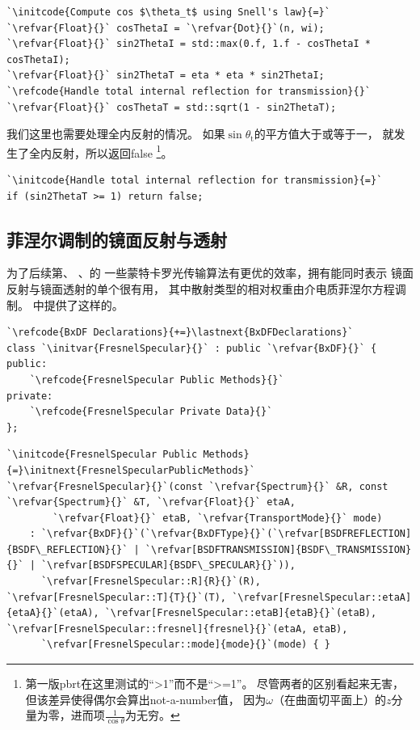 \begin{lstlisting}
`\initcode{Compute cos $\theta_t$ using Snell's law}{=}`
`\refvar{Float}{}` cosThetaI = `\refvar{Dot}{}`(n, wi);
`\refvar{Float}{}` sin2ThetaI = std::max(0.f, 1.f - cosThetaI * cosThetaI);
`\refvar{Float}{}` sin2ThetaT = eta * eta * sin2ThetaI;
`\refcode{Handle total internal reflection for transmission}{}`
`\refvar{Float}{}` cosThetaT = std::sqrt(1 - sin2ThetaT);
\end{lstlisting}

我们这里也需要处理全内反射的情况。
如果$\sin\theta_{\mathrm{t}}$的平方值大于或等于一，
就发生了全内反射，所以返回{\ttfamily false}
\footnote{第一版pbrt在这里测试的“>1”而不是“>=1”。
    尽管两者的区别看起来无害，但该差异使得偶尔会算出not-a-number值，
    因为$\omega$（在曲面切平面上）的$z$分量为零，进而项$\frac{1}{\cos\theta}$为无穷。}。
\begin{lstlisting}
`\initcode{Handle total internal reflection for transmission}{=}`
if (sin2ThetaT >= 1) return false;
\end{lstlisting}

\subsection{菲涅尔调制的镜面反射与透射}\label{sub:菲涅尔调制的镜面反射与透射}
为了后续第、
、的
一些蒙特卡罗光传输算法有更优的效率，拥有能同时表示
镜面反射与镜面透射的单个很有用，
其中散射类型的相对权重由介电质菲涅尔方程调制。
中提供了这样的。
\begin{lstlisting}
`\refcode{BxDF Declarations}{+=}\lastnext{BxDFDeclarations}`
class `\initvar{FresnelSpecular}{}` : public `\refvar{BxDF}{}` {
public:
    `\refcode{FresnelSpecular Public Methods}{}`
private:
    `\refcode{FresnelSpecular Private Data}{}`
};
\end{lstlisting}
\begin{lstlisting}
`\initcode{FresnelSpecular Public Methods}{=}\initnext{FresnelSpecularPublicMethods}`
`\refvar{FresnelSpecular}{}`(const `\refvar{Spectrum}{}` &R, const `\refvar{Spectrum}{}` &T, `\refvar{Float}{}` etaA,
        `\refvar{Float}{}` etaB, `\refvar{TransportMode}{}` mode) 
    : `\refvar{BxDF}{}`(`\refvar{BxDFType}{}`(`\refvar[BSDFREFLECTION]{BSDF\_REFLECTION}{}` | `\refvar[BSDFTRANSMISSION]{BSDF\_TRANSMISSION}{}` | `\refvar[BSDFSPECULAR]{BSDF\_SPECULAR}{}`)),
      `\refvar[FresnelSpecular::R]{R}{}`(R), `\refvar[FresnelSpecular::T]{T}{}`(T), `\refvar[FresnelSpecular::etaA]{etaA}{}`(etaA), `\refvar[FresnelSpecular::etaB]{etaB}{}`(etaB), `\refvar[FresnelSpecular::fresnel]{fresnel}{}`(etaA, etaB),
      `\refvar[FresnelSpecular::mode]{mode}{}`(mode) { }
\end{lstlisting}

